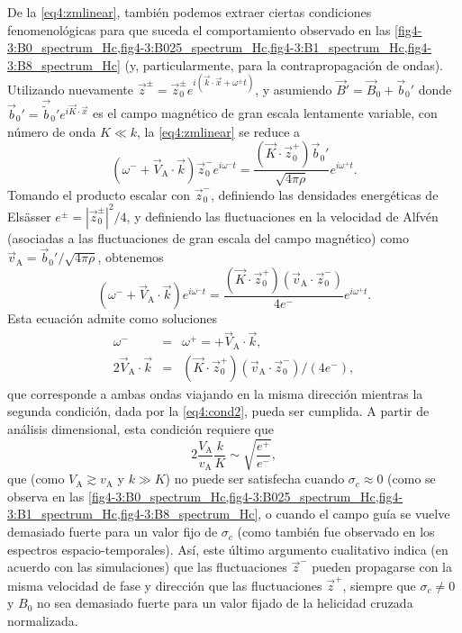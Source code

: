 De la \cref{eq4:zmlinear}, también podemos extraer ciertas condiciones
fenomenológicas para que suceda el comportamiento observado en las
\cref{fig4-3:B0_spectrum_Hc,fig4-3:B025_spectrum_Hc,fig4-3:B1_spectrum_Hc,fig4-3:B8_spectrum_Hc}
(y, particularmente, para la contrapropagación
de ondas). Utilizando nuevamente $\vec{z}^\pm = \vec{z}_0^\pm
e^{i(\vec{k}\cdot \vec{x}+\omega^\pm t)}$, y asumiendo $\vec{B}' =
\vec{B}_0 + \vec{b}_0'$ donde $\vec{b}_0' =
\vec{\tilde{b}}_0'e^{i\vec{K} \cdot \vec{x}}$ es el campo magnético de
gran escala lentamente variable, con número de onda $K \ll k$, la
\cref{eq4:zmlinear} se reduce a
\begin{equation}
\left( \omega^- +\vec{V}_\textrm{A} \cdot \vec{k} \right) 
    \vec{z}_0^- e^{i \omega^- t} = 
    \frac{\left(\vec{K} \cdot \vec{z}_0^+\right) \vec{b}_0'}{\sqrt{4\pi \rho}} 
    e^{i \omega^+ t} .
\end{equation}
Tomando el producto escalar con $\vec{z}_0^-$, definiendo las
densidades energéticas de Els\"asser $e^\pm = |\vec{z}_0^\pm|^2/4$, y
definiendo las fluctuaciones en la velocidad de Alfvén (asociadas a
las fluctuaciones de gran escala del campo magnético) como
$\vec{v}_\textrm{A} = \vec{b}_0'/\sqrt{4\pi \rho}$, obtenemos
\begin{equation}
\left( \omega^- + \vec{V}_\textrm{A} \cdot \vec{k} \right)
    e^{i \omega^- t} = 
    \frac{\left(\vec{K} \cdot \vec{z}_0^+\right)
    \left(\vec{v}_\textrm{A} \cdot \vec{z}_0^-\right)}
    {4e^-} 
    e^{i \omega^+ t} .
\end{equation}
Esta ecuación admite como soluciones
\begin{eqnarray}
    \omega^- &=& \omega^+ =
    + \vec{V}_\textrm{A} \cdot \vec{k}, 
    \label{eq4:cond1} \\
    2 \vec{V}_\textrm{A} \cdot \vec{k} &=& 
    \left(\vec{K} \cdot \vec{z}_0^+\right)
    \left(\vec{v}_\textrm{A} \cdot \vec{z}_0^-\right) /
    (4e^-), \label{eq4:cond2}
\end{eqnarray}
que corresponde a ambas ondas viajando en la misma dirección mientras
la segunda condición, dada por la \cref{eq4:cond2}, pueda ser
cumplida. A partir de análisis dimensional, esta condición requiere
que
\begin{equation}
    2 \frac{V_\textrm{A}}{v_\textrm{A}} \frac{k}{K}
    \sim \sqrt{\frac{e^+}{e^-}},
\end{equation}
que (como $V_\textrm{A}\gtrsim v_\textrm{A}$ y $k\gg K$) no puede ser
satisfecha cuando $\sigma_c \approx 0$ (como se observa en las
\cref{fig4-3:B0_spectrum_Hc,fig4-3:B025_spectrum_Hc,fig4-3:B1_spectrum_Hc,fig4-3:B8_spectrum_Hc},
o cuando el campo guía se vuelve demasiado
fuerte para un valor fijo de $\sigma_c$ (como también fue observado en
los espectros espacio-temporales). Así, este último argumento
cualitativo indica (en acuerdo con las simulaciones) que las
fluctuaciones $\vec{z}^-$ pueden propagarse con la misma velocidad de
fase y dirección que las fluctuaciones $\vec{z}^+$, siempre que
$\sigma_c \neq 0$ y $B_0$ no sea demasiado fuerte para un valor fijado
de la helicidad cruzada normalizada.


